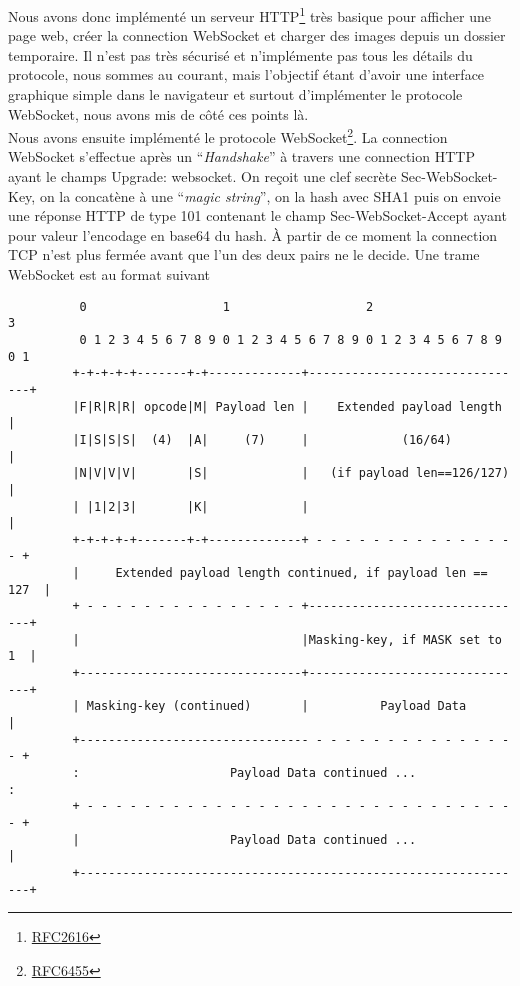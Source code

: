 \documentclass[a4paper,10pt]{article} %
\begin{document}
Nous avons donc implémenté un serveur \textrm{HTTP}\footnote{\href{https://tools.ietf.org/html/rfc2616}{RFC2616}} très basique pour afficher une page web, créer la connection WebSocket et charger des images depuis un dossier temporaire. Il n'est pas très sécurisé et n'implémente pas tous les détails du protocole, nous sommes au courant, mais l'objectif étant d'avoir une interface graphique simple dans le navigateur et surtout d'implémenter le protocole WebSocket, nous avons mis de côté ces points là.\\

Nous avons ensuite implémenté le protocole \textrm{WebSocket}\footnote{\href{https://tools.ietf.org/html/rfc6455}{RFC6455}}. La connection WebSocket s'effectue après un ``\textit{Handshake}'' à travers une connection \textrm{HTTP} ayant le champs \textrm{Upgrade: websocket}. On reçoit une clef secrète \textrm{Sec-WebSocket-Key}, on la concatène à une ``\textit{magic string}'', on la hash avec \textrm{SHA1} puis on envoie une réponse \textrm{HTTP} de type 101 contenant le champ \textrm{Sec-WebSocket-Accept} ayant pour valeur l'encodage en base64 du hash. À partir de ce moment la connection TCP n'est plus fermée avant que l'un des deux pairs ne le decide.
Une trame WebSocket est au format suivant

\begin{verbatim}
          0                   1                   2                   3
          0 1 2 3 4 5 6 7 8 9 0 1 2 3 4 5 6 7 8 9 0 1 2 3 4 5 6 7 8 9 0 1
         +-+-+-+-+-------+-+-------------+-------------------------------+
         |F|R|R|R| opcode|M| Payload len |    Extended payload length    |
         |I|S|S|S|  (4)  |A|     (7)     |             (16/64)           |
         |N|V|V|V|       |S|             |   (if payload len==126/127)   |
         | |1|2|3|       |K|             |                               |
         +-+-+-+-+-------+-+-------------+ - - - - - - - - - - - - - - - +
         |     Extended payload length continued, if payload len == 127  |
         + - - - - - - - - - - - - - - - +-------------------------------+
         |                               |Masking-key, if MASK set to 1  |
         +-------------------------------+-------------------------------+
         | Masking-key (continued)       |          Payload Data         |
         +-------------------------------- - - - - - - - - - - - - - - - +
         :                     Payload Data continued ...                :
         + - - - - - - - - - - - - - - - - - - - - - - - - - - - - - - - +
         |                     Payload Data continued ...                |
         +---------------------------------------------------------------+
\end{verbatim}
\end{document}
